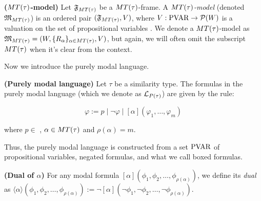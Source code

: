 \par

\begin{definition}

    \textbf{($MT(\tau)$-model)} Let $\mathfrak{F}_{MT(\tau)}$ be a $MT(\tau)$-frame. A \textit{$MT(\tau)$-model} (denoted $\mathfrak{M}_{MT(\tau)}$) is an ordered pair $(\mathfrak{F}_{MT(\tau)},V)$, where $V:\text{PVAR}\to\mathcal{P}(W)$ is a valuation on the set of propositional variables \PVAR. We denote a $MT(\tau)$-model as $\mathfrak{M}_{MT(\tau)} = (W,\{ R_{\alpha} \}_{\alpha \in MT(\tau)},V)$, but again, we will often omit the subscript $MT(\tau)$ when it's clear from the context.

\end{definition}



\par Now we introduce the purely modal language.



\begin{definition}

    \textbf{(Purely modal language)}  Let $\tau$ be a similarity type. The formulas in the purely modal language (which we denote as $\mathcal{L}_{P(\tau)}$) are given by the rule:

    \begin{equation*}
        \varphi := p\mid \neg\varphi \mid [\alpha](\varphi_1,\ldots,\varphi_m)
    \end{equation*}

    \par where $p\in$ \PVAR, $\alpha \in MT(\tau)$ and $\rho(\alpha)=m$.

\end{definition}

Thus, the purely modal language is constructed from a set $\text{PVAR}$ of propositional variables, negated formulas, and what we call boxed formulas.



\begin{definition}\label{dual of alpha}

    \textbf{(Dual of $\alpha$)} For any modal formula $[\alpha](\phi_1,\phi_2,\ldots,\phi_{\rho(\alpha)})$, we define its \textit{dual} as $\langle\alpha\rangle(\phi_1,\phi_2,\ldots,\phi_{\rho(\alpha)}) := \neg[\alpha](\neg\phi_1,\neg\phi_2,\ldots,\neg\phi_{\rho(\alpha)})$.

\end{definition}



